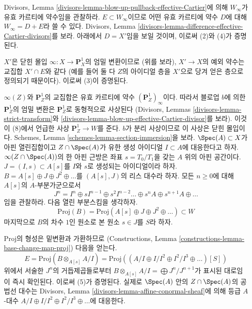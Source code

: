 \medskip\noindent
Divisors, Lemma \ref{divisors-lemma-blow-up-pullback-effective-Cartier}에
의해 $W_\infty$가 유효 카르티에 약수임을 관찰하라.
$E \subset W_\infty$이므로 어떤 유효 카르티에 약수 $D$에 대해
$W_\infty = D + E$라 쓸 수 있다. Divisors, Lemma
\ref{divisors-lemma-difference-effective-Cartier-divisors}를 보라.
아래에서 $D = X'$임을 보일 것이며, 이로써 (2)와 (4)가 증명된다.

\medskip\noindent
$X'$은 닫힌 몰입 $\infty : X \to \mathbf{P}^1_X$의 엄밀 변환이므로
(위를 보라), $X' \to X$의 예외 약수는 교집합 $X' \cap E$와 같다
(예를 들어 둘 다 $Z$의 아이디얼 층을 $X'$으로 당겨 얻은 층으로
정의되기 때문이다). 이로써 (3)이 증명된다.

\medskip\noindent
$\infty(Z)$와 $\mathbf{P}^1_Z$의 교집합은 유효 카르티에 약수
$(\mathbf{P}^1_Z)_\infty$이다. 따라서 블로업 $b$에 의한
$\mathbf{P}^1_Z$의 엄밀 변환은 $\mathbf{P}^1_Z$로 동형적으로 사상된다
(Divisors, Lemmas \ref{divisors-lemma-strict-transform}와
\ref{divisors-lemma-blow-up-effective-Cartier-divisor}를 보라).
이것이 (8)에서 언급한 사상 $\mathbf{P}^1_Z \to W$를 준다.
$b$가 분리 사상이므로 이 사상은 닫힌 몰입이다. Schemes, Lemma
\ref{schemes-lemma-section-immersion}을 보라.
\medskip\noindent
$\Spec(A) \subset X$가 아핀 열린집합이고 $Z \cap \Spec(A)$가 유한 생성
아이디얼 $I \subset A$에 대응한다고 하자. $\infty(Z \cap \Spec(A))$의
한 아핀 근방은 좌표 $s = T_0/T_1$을 갖는 $A$ 위의 아핀 공간이다.
$J = (I, s) \subset A[s]$를 $I$와 $s$로 생성되는 아이디얼이라 하자.
$B = A[s] \oplus J \oplus J^2 \oplus \ldots$를 $(A[s], J)$의 리스
대수라 하자. 모든 $n \geq 0$에 대해 $A[s]$의 $A$-부분가군으로서
$$
J^n =
I^n \oplus sI^{n - 1} \oplus s^2I^{n - 2} \ldots \oplus s^nA
\oplus s^{n + 1}A \oplus \ldots
$$
임을 관찰하라. 다음 열린 부분스킴을 생각하자.
$$
\text{Proj}(B) = \text{Proj}(A[s] \oplus J \oplus J^2 \oplus \ldots)
\subset W
$$
마지막으로 $B$의 차수 $1$인 원소로 본 원소 $s \in J$를 $S$라 하자.

\medskip\noindent
$\text{Proj}$의 형성은 밑변환과 가환하므로
(Constructions, Lemma \ref{constructions-lemma-base-change-map-proj})
다음을 얻는다.
$$
E = \text{Proj}(B \otimes_{A[s]} A/I) =
\text{Proj}((A/I \oplus I/I^2 \oplus I^2/I^3 \oplus \ldots)[S])
$$
위에서 서술한 $J^n$의 거듭제곱들로부터
$B \otimes_{A[s]} A/I = \bigoplus J^n/J^{n + 1}$가 표시된 대로임이
즉시 확인된다. 이로써 (5)가 증명된다. 실제로 $\Spec(A)$ 안의
$Z \cap \Spec(A)$의 공법선 대수는 Divisors, Lemma
\ref{divisors-lemma-affine-conormal-sheaf}에 의해 등급 $A$-대수
$A/I \oplus I/I^2 \oplus I^2/I^3 \oplus \ldots$에 대응한다.

